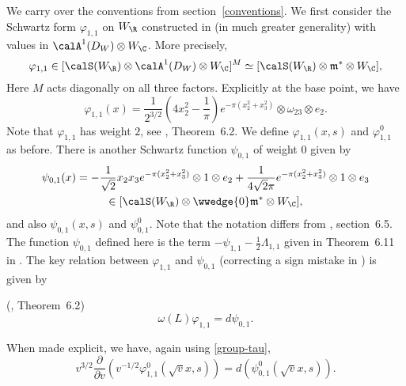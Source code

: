We carry over the conventions from section~\ref{conventions}. We
first consider the Schwartz form $\varphi_{1,1}$ on $W_{\R}$
constructed in \cite{FMcoeff} (in much greater generality) with
values in $\calA^1(D_W) \otimes W_{\C}$. More precisely,
\[
\varphi_{1,1} \in [\calS(W_{\R}) \otimes \calA^1(D_W) \otimes W_{\C}]^M \simeq
[\calS(W_{\R}) \otimes \mathfrak{m}^{\ast} \otimes W_{\C}],
\]
Here $M$ acts diagonally on all three factors. Explicitly at the base point, we have
\begin{equation*}
\varphi_{1,1}(x) = \frac{1}{2^{3/2}} \left(4 x_2^2-\frac1{\pi}\right) e^{-\pi (x_2^2+x_3^2)} \otimes \omega_{23} \otimes e_2.
\end{equation*}
Note that $\varphi_{1,1}$ has weight $2$, see \cite{FMcoeff},
Theorem~6.2. We define $\varphi_{1,1}(x,s)$ and $\varphi_{1,1}^0$
as before. There is another Schwartz function $\psi_{0,1}$ of weight
$0$ given by
\begin{multline*}
\psi_{0,1}(x) =   -\frac1{\sqrt{2}} x_2x_3 e^{-\pi(x_2^2+x_3^2)}  \otimes 1 \otimes e_2 + \frac{1}{4\sqrt{2}\pi} e^{-\pi(x_2^2+x_3^2)} \otimes 1\otimes e_3 \\ \in
[\calS(W_{\R}) \otimes \wwedge{0} \mathfrak{m}^{\ast} \otimes W_{\C}],
\end{multline*}
and also $\psi_{0,1}(x,s)$ and $\psi_{0,1}^0$. Note that the notation
differs from \cite{FMcoeff}, section~6.5. The function $\psi_{0,1}$
defined here is the term $-\psi_{1,1} - \tfrac12 \Lambda_{1,1}$
given in Theorem~6.11 in \cite{FMcoeff}.
The key relation between $\varphi_{1,1}$ and $\psi_{0,1}$ (correcting a sign mistake in \cite{FMcoeff}) is given by

\begin{theorem}(\cite{FMcoeff}, Theorem~6.2\label{Millson})\label{localholW}
\[ \omega(L) \varphi_{1,1} = d \psi_{0,1}.  \]
\end{theorem}

When made explicit, we have, again using \eqref{group-tau},
\begin{equation}
v^{3/2} \frac{\partial}{\partial v } \left(v^{-1/2} \varphi_{1,1}^0(\sqrt{v}x,s) \right)=  d
\left(\psi_{0,1}^0(\sqrt{v}x,s)\right).
\end{equation}


